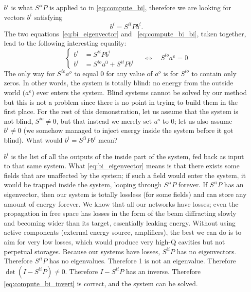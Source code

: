$b^i$ is what $S^{ii}P$ is applied to in \cref{eq:compute_bi}, therefore we are looking for vectors $b^i$ satisfying
\begin{equation}
    b^i = S^{ii}P b^i \text{.} \label{eq:bi_eigenvector}
\end{equation}
The two equations~\cref{eq:bi_eigenvector} and ~\cref{eq:compute_bi_bi}, taken together, 
lead to the following interesting equality:
\begin{equation}
    \left\lbrace
        \begin{aligned}
            b^i &= S^{ii}P b^i \\
            b^i &= S^{io}a^0 + S^{ii}P b^i
        \end{aligned}
    \right.
    \quad
    \Longleftrightarrow
    \quad
    S^{io}a^o = 0
\end{equation}
The only way for $S^{io}a^o$ to equal 0 for any value of $a^o$ is for $S^{io}$ to contain only zeros.
In other words, the system is totally blind: no energy from the outside world ($a^o$) ever enters the system.
Blind systems cannot be solved by our method but this is not a problem since there is no point in trying to build them in the first place.
For the rest of this demonstration, let us assume that the system is not blind, $S^{io}\neq 0$, but that instead we merely set $a^o$ to 0; let us also assume $b^i \neq 0$ (we somehow managed to inject energy inside the system before it got blind).
What would $b^i = S^{ii}P b^i$ mean?

$b^i$ is the list of all the outputs of the inside part of the system, fed back as input to that same system.
What \cref{eq:bi_eigenvector} means is that there exists some fields that are unaffected by the system; if such a field would enter the system, it would be trapped inside the system, looping through $S^{ii}P$ forever.
If $S^{ii}P$ has an eigenvector, then our system is totally lossless (for some fields) and can store any amount of energy forever.
We know that all our networks have losses; even the propagation in free space has losses in the form of the beam diffracting slowly and becoming wider than its target, essentially leaking energy.
Without using active components (external energy source, amplifiers), the best we can do is to aim for very low losses, which would produce very high-Q cavities but not perpetual storages.
Because our systems have losses, $S^{ii}P$ has no eigenvectors.
Therefore $S^{ii}P$ has no eigenvalues.
Therefore 1 is not an eigenvalue.
Therefore $\det(I-S^{ii}P) \neq 0$.
Therefore $I-S^{ii}P$ has an inverse.
Therefore \cref{eq:compute_bi_invert} is correct, and the system can be solved.

